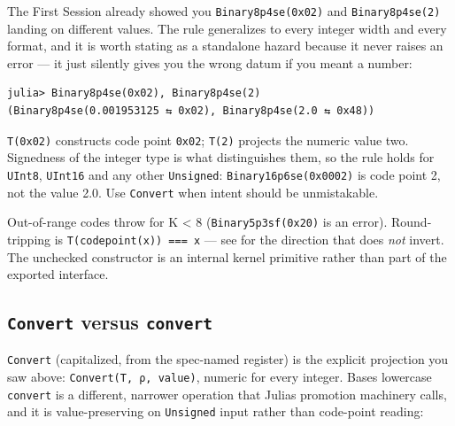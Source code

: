 \label{6585316590758660594}{}


The First Session already showed you \texttt{Binary8p4se(0x02)} and \texttt{Binary8p4se(2)} landing on different values. The rule generalizes to every integer width and every format, and it is worth stating as a standalone hazard because it never raises an error — it just silently gives you the wrong datum if you meant a number:




\nopagebreak[4]
\begin{verbatim}
julia> Binary8p4se(0x02), Binary8p4se(2)
(Binary8p4se(0.001953125 ⇆ 0x02), Binary8p4se(2.0 ⇆ 0x48))
\end{verbatim}



\begin{tcolorbox}[toptitle=-1mm,bottomtitle=1mm,colback=admonition-warning!50!white,colframe=admonition-warning,title=\textbf{`Unsigned` means code point — at every width}]
\texttt{T(0x02)} constructs code point \texttt{0x02}; \texttt{T(2)} projects the numeric value two. Signedness of the integer type is what distinguishes them, so the rule holds for \texttt{UInt8}, \texttt{UInt16} and any other \texttt{Unsigned}: \texttt{Binary16p6se(0x0002)} is code point 2, not the value 2.0. Use \texttt{Convert} when intent should be unmistakable.

Out-of-range codes throw for K < 8 (\texttt{Binary5p3sf(0x20)} is an error). Round-tripping is \texttt{T(codepoint(x)) === x} — see  for the direction that does \emph{not} invert. The unchecked constructor is an internal kernel primitive rather than part of the exported interface.

\end{tcolorbox}


\subsection{\texttt{Convert} versus \texttt{convert}}



\label{4082966728771053146}{}


\texttt{Convert} (capitalized, from the spec-named register) is the explicit projection you saw above: \texttt{Convert(T, ρ, value)}, numeric for every integer. Base{\textquotesingle}s lowercase \texttt{convert} is a different, narrower operation that Julia{\textquotesingle}s promotion machinery calls, and it is value-preserving on \texttt{Unsigned} input rather than code-point reading:




